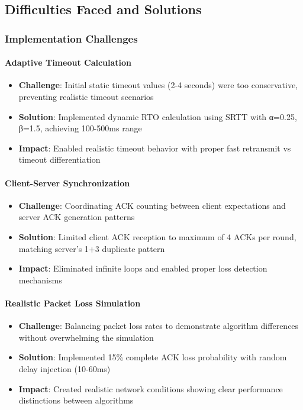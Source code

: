 \documentclass[12pt]{article}
\begin{document}
\subsection{Difficulties Faced and Solutions}

\subsubsection{Implementation Challenges}

\paragraph{Adaptive Timeout Calculation}
\begin{itemize}
    \item \textbf{Challenge}: Initial static timeout values (2-4 seconds) were too conservative, preventing realistic timeout scenarios
    \item \textbf{Solution}: Implemented dynamic RTO calculation using SRTT with α=0.25, β=1.5, achieving 100-500ms range
    \item \textbf{Impact}: Enabled realistic timeout behavior with proper fast retransmit vs timeout differentiation
\end{itemize}

\paragraph{Client-Server Synchronization}
\begin{itemize}
    \item \textbf{Challenge}: Coordinating ACK counting between client expectations and server ACK generation patterns
    \item \textbf{Solution}: Limited client ACK reception to maximum of 4 ACKs per round, matching server's 1+3 duplicate pattern
    \item \textbf{Impact}: Eliminated infinite loops and enabled proper loss detection mechanisms
\end{itemize}

\paragraph{Realistic Packet Loss Simulation}
\begin{itemize}
    \item \textbf{Challenge}: Balancing packet loss rates to demonstrate algorithm differences without overwhelming the simulation
    \item \textbf{Solution}: Implemented 15\% complete ACK loss probability with random delay injection (10-60ms)
    \item \textbf{Impact}: Created realistic network conditions showing clear performance distinctions between algorithms
\end{itemize}
\end{document}
